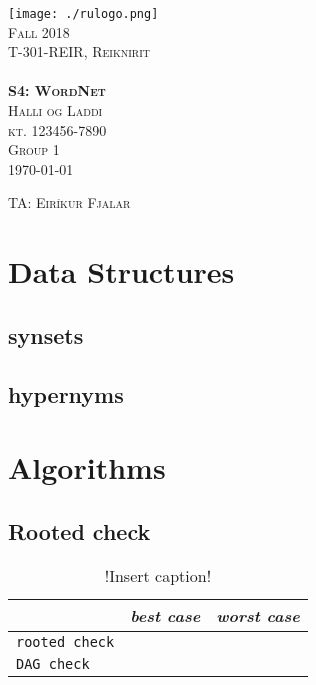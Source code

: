 \documentclass[11pt,a4paper,notitlepage]{article}
\newcommand{\semester}{Fall 2018}
\newcommand{\coursename}{Reiknirit}
\newcommand{\courseid}{T-301-REIR}
\newcommand{\assignment}{S4: WordNet}
\newcommand{\dateofcompilation}{\today}
\newcommand{\ssn}{kt. 123456-7890}              %
\newcommand{\group}{1}
\newcommand{\teachingassistant}{TA: Eiríkur Fjalar}   %
\newcommand{\students}{
    Halli og Laddi                             %
}
\newcommand{\maketitlepage}[1]
{
    \begin{titlepage}

        \begin{center}
            \texttt{[image: ./rulogo.png]}\\[1.5cm]

            \textsc{\huge \semester}\\[0.8cm]

            {\textsc{\Huge \courseid, \coursename}}\\[0.4cm]
            \textsc{\LARGE }\\[2.5cm]

            \textbf{\textsc{\Huge #1}}\\[3cm]


            \textsc{\huge \students}\\[0.4cm]
            \textsc{\LARGE \ssn}\\[0.4cm]
            \textsc{\LARGE Group \group}\\[1cm]
            \textsc{\Large \dateofcompilation}


        \end{center}

        \vfill

        \begin{flushleft}
            \textsc{\Large \teachingassistant}
        \end{flushleft}

    \end{titlepage}
}
\newcommand{\explanation}[1]{}  %
\begin{document}
    \maketitlepage{\assignment}

\explanation{Directions on performing the assignment are showed here in italics (like this). These should not be included in the report you submit.}


\section{Data Structures}

\subsection*{synsets}

\explanation{Describe concisely the data structure(s) you used to store the 
information in synsets.txt. Why did you make this choice?}

\subsection*{hypernyms}

\explanation{Describe concisely the data structure(s) you used to store the 
information in hypernyms.txt. Why did you make this choice?}

\section{Algorithms}

\subsection*{Rooted check}

\explanation{
  Describe concisely the algorithm you used to check if the digraph 
  is rooted and the algorithm you used to check if the digrah is a DAG.  
  What is the order of growth of the best case 
  running time as a function of the number of vertices V and the 
  number of edges E in the digraph? And what is the order of growth 
  of the worst case running time?}

\explanation{
 Be careful! It is very easy to get these wrong. Keep in mind
  what the 'best case' and 'worst case' entail. Don't forget about
  the fact that starting a breadth first search in Java means 
  initializing edgeTo[] arrays, etc.
}

\begin{table}[htbp]
\renewcommand{\arraystretch}{2}
  \centering
  \caption{!Insert caption!}
        \label{tab:table1}
        \begin{tabular}{l| c | c }
         & \qquad \emph{best case} \qquad & \qquad \emph{worst case} \qquad \\
        \hline
        \texttt{rooted check} & & \\\hline
        \texttt{DAG check} & & \\
        \hline
        \end{tabular}
\end{table}
\end{document}
